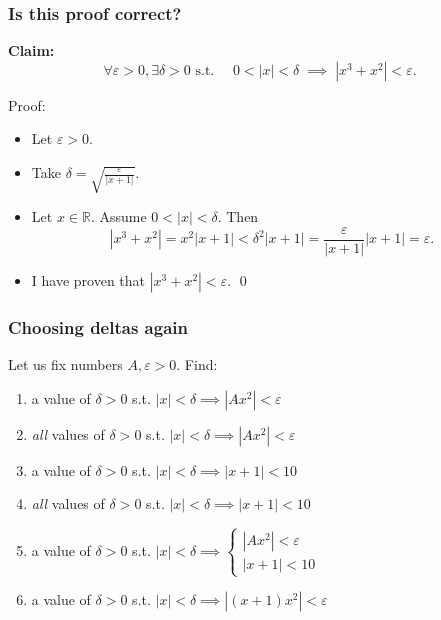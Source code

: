 \begin{frame}[t]
	\frametitle{Is this proof correct?}

	{\bfseries Claim:}
	\[
		\forall \varepsilon >0, \exists \delta>0 \text{ s.t. }\quad 0<|x|<\delta \; \implies
		\; |x^{3}+x^{2}| < \varepsilon.
	\]
	\vfill
	\begin{block}{Proof:}
		\begin{itemize}
			\item Let $\varepsilon >0$.

			\item Take $\displaystyle \delta = \sqrt{\frac{\varepsilon}{|x+1|}}$.

			\item Let $x \in \mathbb{R}$. Assume $0 < |x| < \delta$. Then
				\[
					|x^{3}+x^{2}| = x^{2}| x + 1| < \delta^{2}|x+1| = \frac{\varepsilon}{|x+1|}
					|x+1| = \varepsilon.
				\]

			\item I have proven that $\displaystyle |x^{3}+x^{2}| < \varepsilon$.
				\hfill \qed
		\end{itemize}
	\end{block}

	\vfill
\end{frame}

\begin{frame}[t]
	\frametitle{Choosing deltas again}

	Let us fix numbers $A, \varepsilon >0$. Find:

	\vfill

	\begin{enumerate}
		\item a value of $\delta >0$ \; s.t. \hfill
			$\displaystyle |x|< \delta \implies |Ax^{2}|<\varepsilon$
			\vfill

		\item \emph{all} values of $\delta >0$ \; s.t. \hfill $\displaystyle |x|< \delta
			\implies |Ax^{2}|<\varepsilon$
			\vfill

		\item a value of $\delta >0$ \; s.t. \hfill
			$\displaystyle |x|< \delta \implies |x+1| < 10$
			\vfill

		\item \emph{all} values of $\delta >0$ \; s.t. \hfill $\displaystyle |x|< \delta
			\implies |x+1| < 10$
			\vfill

		\item a value of $\delta >0$ \; s.t. \hfill
			$\displaystyle |x|< \delta \implies \left\{
			\begin{array}{c}
				|Ax^2|<\varepsilon \\
				|x+1| < 10
			\end{array}
			\right.$
			\vfill

		\item a value of $\delta >0$ \; s.t. \hfill
			$\displaystyle |x| < \delta \implies |(x+1)x^{2}| < \varepsilon$
			\vfill
	\end{enumerate}
\end{frame}

